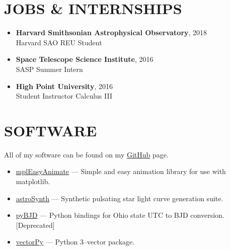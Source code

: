\documentclass[margin, 10pt]{res} %
\begin{document}
\begin{resume}
\section{JOBS \& INTERNSHIPS}
\begin{itemize}
  \item \textbf{{\scriptsize Harvard Smithsonian Astrophysical Observatory}}, {\small 2018} \\Harvard SAO REU Student
  \item \textbf{{\scriptsize Space Telescope Science Institute}}, {\small 2016} \\SASP Summer Intern
  \item \textbf{{\scriptsize High Point University}}, {\small 2016}\\Student Instructor Calculus III
\end{itemize}

\section{SOFTWARE}
All of my software can be found on my \href{https://github.com/tboudreaux}{GitHub} page.
\begin{itemize}
\item \href{https://github.com/tboudreaux/mpl_animate}{mplEasyAnimate} --- Simple and easy animation library for use with matplotlib.
\item \href{https://github.com/AstroSynth/astroSynth}{astroSynth} --- Synthetic pulsating star light curve generation suite.
\item \href{https://github.com/tboudreaux/pyBJD}{pyBJD} --- Python bindings for Ohio state UTC to BJD conversion. [Deprecated]
\item \href{https://github.com/tboudreaux/vectorpy}{vectorPy} --- Python 3--vector package.
\end{itemize}


\end{resume}
\end{document}
